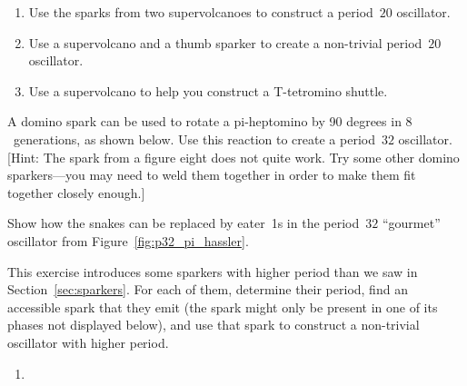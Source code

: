 \begin{multicols}{2}
\begin{problem}
		\begin{center}
		\end{center}
		
		\begin{enumerate}[label=\bf\color{ocre}(\alph*)]
			\item Use the sparks from two supervolcanoes to construct a period~$20$ oscillator.
			
			\item Use a supervolcano and a thumb sparker to create a non-trivial period~$20$ oscillator.
			
			\item Use a supervolcano to help you construct a T-tetromino shuttle.
		\end{enumerate}
	\end{problem}
	
	
	\mfilbreak
	
	
	\begin{problemstar}\label{exer:pi_hassle}
		A domino spark can be used to rotate a pi-heptomino by 90 degrees in $8$~generations, as shown below. Use this reaction to create a period~$32$ oscillator. [Hint: The spark from a figure eight does not quite work. Try some other domino sparkers---you may need to weld them together in order to make them fit together closely enough.]
		\begin{center}
		\end{center}
	\end{problemstar}
	
	
	\mfilbreak
	
	
	\begin{problemstar}\label{exer:p32_pi_hassler_eaters}
		Show how the snakes can be replaced by eater~1s in the period~$32$ ``gourmet'' oscillator from Figure~\ref{fig:p32_pi_hassler}.
	\end{problemstar}
	
	
	\mfilbreak
	
	
	\begin{problemstar}\label{exer:high_period_sparkers}
		This exercise introduces some sparkers with higher period than we saw in Section~\ref{sec:sparkers}. For each of them, determine their period, find an accessible spark that they emit (the spark might only be present in one of its phases not displayed below), and use that spark to construct a non-trivial oscillator with higher period.
		\begin{multicols}{2}
			\begin{enumerate}
				\item[\bf\color{ocre}(a)] 
				

\end{enumerate}
\end{multicols}
\end{problemstar}
\end{multicols}
